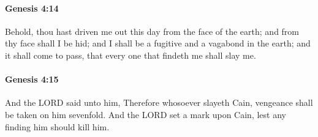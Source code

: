 		\paragraph{Genesis 4:14} %
			\label{GENESIS-4-14}

			Behold, thou hast driven me out this day from the face of the earth; and from thy face shall I be hid; and I shall be a fugitive and a vagabond in the earth; and it shall come to pass, that every one that findeth me shall slay me.


		\paragraph{Genesis 4:15} %
			\label{GENESIS-4-15}

			And the LORD said unto him, Therefore whosoever slayeth Cain, vengeance shall be taken on him sevenfold. And the LORD set a mark upon Cain, lest any finding him should kill him.

